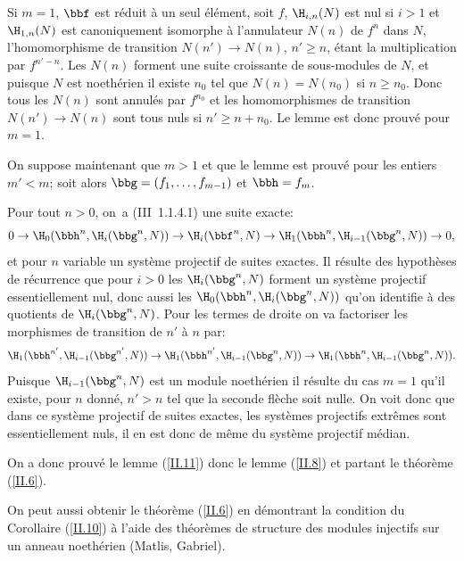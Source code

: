 Si $m=1$, $\bbf$ est r\'eduit \`a un seul \'el\'ement, soit $f$, $\H_{i, n}(N)$ est nul si $i>1$ et $\H_{1, n}(N)$ est canoniquement isomorphe \`a l'annulateur $N(n)$ de $f^n$ dans $N$, l'homomorphisme de transition $N(n')\to N(n)$, $n'\geq n$, \'etant la multiplication par $f^{n'-n}$. Les $N(n)$ forment une suite croissante de sous-modules de $N$, et puisque $N$ est noeth\'erien il existe $n_0$ tel que $N(n)=N(n_0)$ si $n\geq n_0$. Donc tous les $N(n)$ sont annul\'es par $f^{n_0}$ et les homomorphismes de transition $N(n')\to N(n)$ sont tous nuls si $n'\geq n+n_0$. Le lemme est donc prouv\'e pour $m=1$.

On suppose maintenant que $m>1$ et que le lemme est prouv\'e pour les entiers $m'<m$; soit alors $\bbg=(f_1, \ldots, f_{m-1})$ et $\bbh=f_m$.

Pour tout $n>0$, on~a (\EGA III~1.1.4.1) une suite exacte:
\begin{equation*}
0 \to \H_0(\bbh^n, \H_i(\bbg^n, N)) \to \H_i(\bbf^n, N) \to \H_1(\bbh^n, \H_{i-1}(\bbg^n, N)) \to 0,
\end{equation*}
et pour $n$ variable un syst\`eme projectif de suites exactes. Il r\'esulte des hypoth\`eses de r\'ecurrence que pour $i>0$ les $\H_i(\bbg^n, N)$ forment un syst\`eme projectif essentiellement nul, donc aussi les $\H_0(\bbh^n, \H_i(\bbg^n, N))$ qu'on identifie \`a des quotients de $\H_i(\bbg^n, N)$. Pour les termes de droite on va factoriser les morphismes de transition de $n'$ \`a $n$ par:
\begin{equation*}
\H_1(\bbh^{n'}, \H_{i-1}(\bbg^{n'}, N)) \to \H_1(\bbh^{n'}, \H_{i-1}(\bbg^{n}, N)) \to \H_1(\bbh^{n}, \H_{i-1}(\bbg^{n}, N)).
\end{equation*}
Puisque $\H_{i-1}(\bbg^{n}, N)$ est un module noeth\'erien il r\'esulte du cas $m=1$ qu'il existe, pour $n$ donn\'e, $n'>n$ tel que la seconde fl\`eche soit nulle. On voit donc que dans ce syst\`eme projectif de suites exactes, les syst\`emes projectifs extr\^emes sont essentiellement nuls, il en est donc de m\^eme du syst\`eme projectif m\'edian.

On a donc prouv\'e le lemme (\ref{II.11}) donc le lemme (\ref{II.8}) et partant le th\'eor\`eme (\ref{II.6}).

\begin{remarquestar}
On peut aussi obtenir le th\'eor\`eme (\ref{II.6}) en d\'emontrant la condition du Corollaire (\ref{II.10}) \`a l'aide des th\'eor\`emes de structure des modules injectifs sur un anneau noeth\'erien (Matlis, Gabriel).
\end{remarquestar}

